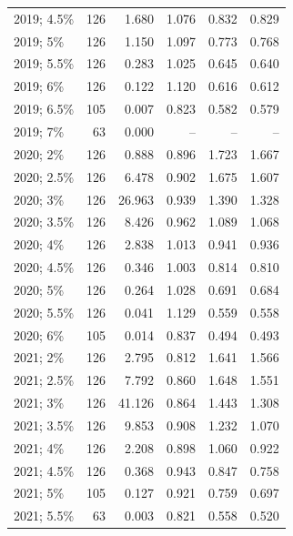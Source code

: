 {\begin{longtable}{@{}lrrrrr@{}}
2019; 4.5\% & 126 & 1.680 & 1.076 & 0.832 & 0.829\\
2019; 5\% & 126 & 1.150 & 1.097 & 0.773 & 0.768\\
2019; 5.5\% & 126 & 0.283 & 1.025 & 0.645 & 0.640\\
2019; 6\% & 126 & 0.122 & 1.120 & 0.616 & 0.612\\
2019; 6.5\% & 105 & 0.007 & 0.823 & 0.582 & 0.579\\
2019; 7\% & 63 & 0.000 & -- & -- & --\\
2020; 2\% & 126 & 0.888 & 0.896 & 1.723 & 1.667\\
2020; 2.5\% & 126 & 6.478 & 0.902 & 1.675 & 1.607\\
2020; 3\% & 126 & 26.963 & 0.939 & 1.390 & 1.328\\
2020; 3.5\% & 126 & 8.426 & 0.962 & 1.089 & 1.068\\
2020; 4\% & 126 & 2.838 & 1.013 & 0.941 & 0.936\\
2020; 4.5\% & 126 & 0.346 & 1.003 & 0.814 & 0.810\\
2020; 5\% & 126 & 0.264 & 1.028 & 0.691 & 0.684\\
2020; 5.5\% & 126 & 0.041 & 1.129 & 0.559 & 0.558\\
2020; 6\% & 105 & 0.014 & 0.837 & 0.494 & 0.493\\
2021; 2\% & 126 & 2.795 & 0.812 & 1.641 & 1.566\\
2021; 2.5\% & 126 & 7.792 & 0.860 & 1.648 & 1.551\\
2021; 3\% & 126 & 41.126 & 0.864 & 1.443 & 1.308\\
2021; 3.5\% & 126 & 9.853 & 0.908 & 1.232 & 1.070\\
2021; 4\% & 126 & 2.208 & 0.898 & 1.060 & 0.922\\
2021; 4.5\% & 126 & 0.368 & 0.943 & 0.847 & 0.758\\
2021; 5\% & 105 & 0.127 & 0.921 & 0.759 & 0.697\\
2021; 5.5\% & 63 & 0.003 & 0.821 & 0.558 & 0.520\\
\bottomrule
\end{longtable}
}
